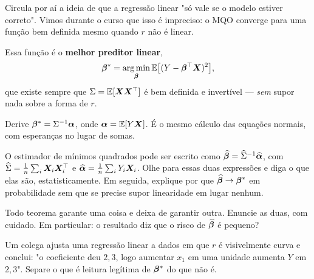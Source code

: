 Circula por aí a ideia de que a regressão linear "só vale se o modelo estiver
correto". Vimos durante o curso que isso é impreciso: o MQO converge para uma função
bem definida mesmo quando $r$ não é linear.

Essa função é o \textbf{melhor preditor linear},
\[
  \bbeta^\ast = \argmin_{\bbeta} \E\big[(Y-\bbeta^\top\X)^2\big],
\]
que existe sempre que $\Sigma=\mathbb{E}[\bm{X}\bm{X}^\top]$ é bem definida e invertível ---
\emph{sem} supor nada sobre a forma de $r$.
\begin{itens}
  \item {} Derive $\bm{\beta}^\ast=\Sigma^{-1}\bm\alpha$, onde
        $\bm\alpha=\mathbb{E}[Y\bm{X}]$. É o mesmo cálculo das equações normais, com
        esperanças no lugar de somas.
  \item {} O estimador de mínimos quadrados pode ser escrito como
        $\widehat{\bm{\beta}}=\widehat\Sigma^{-1}\widehat{\bm\alpha}$, com
        $\widehat\Sigma=\frac1n\sum_i\bm{X}_i\bm{X}_i^\top$ e
        $\widehat{\bm\alpha}=\frac1n\sum_i Y_i\bm{X}_i$. Olhe para essas duas
        expressões e diga o que elas são, estatisticamente. Em seguida, explique
        por que $\widehat{\bm{\beta}}\to\bm{\beta}^\ast$ em probabilidade sem que se precise
        supor linearidade em lugar nenhum.
  \item {} Todo teorema garante uma coisa e deixa de garantir outra.
        Enuncie as duas, com cuidado. Em particular: o resultado diz que o risco
        de $\widehat{\bm{\beta}}$ é pequeno?
  \item {} Um colega ajusta uma regressão linear a dados em que $r$ é
        visivelmente curva e conclui: "o coeficiente deu $2{,}3$, logo aumentar
        $x_1$ em uma unidade aumenta $Y$ em $2{,}3$". Separe o que é leitura
        legítima de $\bm{\beta}^\ast$ do que não é.
\end{itens}

